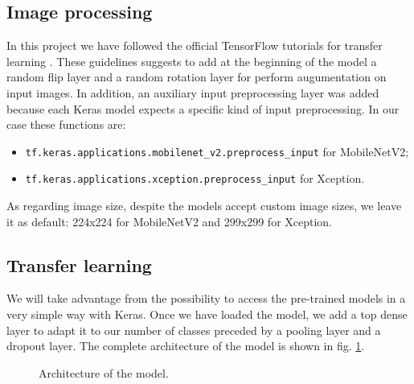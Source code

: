 \documentclass[12pt]{llncs}
\begin{document}
\subsection{Image processing}
In this project we have followed the official TensorFlow tutorials for transfer learning \cite{tf-transfer}. These guidelines suggests to add at the beginning of the model a random flip layer and a random rotation layer for perform augumentation on input images. In addition, an auxiliary input preprocessing layer was added because each Keras model expects a specific kind of input preprocessing. In our case these functions are:
\begin{itemize}
\item \texttt{tf.keras.applications.mobilenet\_v2.preprocess\_input} for MobileNetV2;
\item \texttt{tf.keras.applications.xception.preprocess\_input} for Xception.
\end{itemize}
As regarding image size, despite the models accept custom image sizes, we leave it as default: 224x224 for MobileNetV2 and 299x299 for Xception.

\subsection{Transfer learning}
We will take advantage from the possibility to access the pre-trained models in a very simple way with Keras. Once we have loaded the model, we add a top dense layer to adapt it to our number of classes preceded by a pooling layer and a dropout layer. The complete architecture of the model is shown in fig. \ref{fig:model}.

\begin{figure}[h]
	\centering
    \caption{Architecture of the model.}
    \label{fig:model}
\end{figure}
\end{document}
